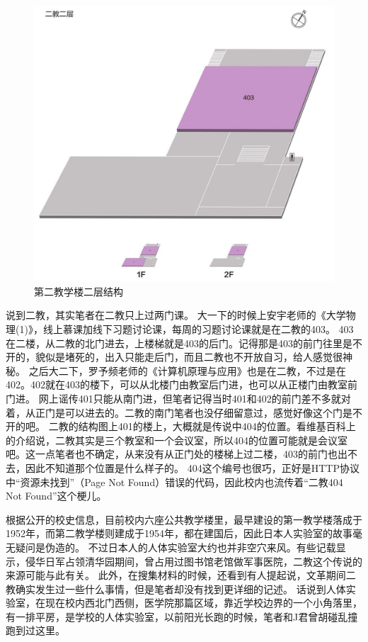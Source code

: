 \begin{figure}[!t]
	\centering
	\includegraphics[width=\linewidth]{figures/二教二层.jpg}
	第二教学楼二层结构
\end{figure}

说到二教，其实笔者在二教只上过两门课。
大一下的时候上安宇老师的《大学物理(1)》，线上慕课加线下习题讨论课，每周的习题讨论课就是在二教的403。
403在二楼，从二教的北门进去，上楼梯就是403的后门。记得那是403的前门往里是不开的，貌似是堵死的，出入只能走后门，而且二教也不开放自习，给人感觉很神秘。
之后大二下，罗予频老师的《计算机原理与应用》也是在二教，不过是在402。402就在403的楼下，可以从北楼门由教室后门进，也可以从正楼门由教室前门进。
网上谣传401只能从南门进，但笔者记得当时401和402的前门差不多就对着，从正门是可以进去的。二教的南门笔者也没仔细留意过，感觉好像这个门是不开的吧。
二教的结构图上401的楼上，大概就是传说中404的位置。看维基百科上的介绍说，二教其实是三个教室和一个会议室，所以404的位置可能就是会议室吧。这一点笔者也不确定，从来没有从正门处的楼梯上过二楼，403的前门也出不去，因此不知道那个位置是什么样子的。
404这个编号也很巧，正好是HTTP协议中“资源未找到”（Page Not Found）错误的代码，因此校内也流传着“二教404 Not Found”这个梗儿。

根据公开的校史信息，目前校内六座公共教学楼里，最早建设的第一教学楼落成于1952年，而第二教学楼则建成于1954年，都在建国后，因此日本人实验室的故事毫无疑问是伪造的。
不过日本人的人体实验室大约也并非空穴来风。有些记载显示，侵华日军占领清华园期间，曾占用过图书馆老馆做军事医院，二教这个传说的来源可能与此有关。
此外，在搜集材料的时候，还看到有人提起说，文革期间二教确实发生过一些什么事情，但是笔者却没有找到更详细的记述。
话说到人体实验室，在现在校内西北门西侧，医学院那篇区域，靠近学校边界的一个小角落里，有一排平房，是学校的人体实验室，以前阳光长跑的时候，笔者和J君曾胡碰乱撞跑到过这里。

